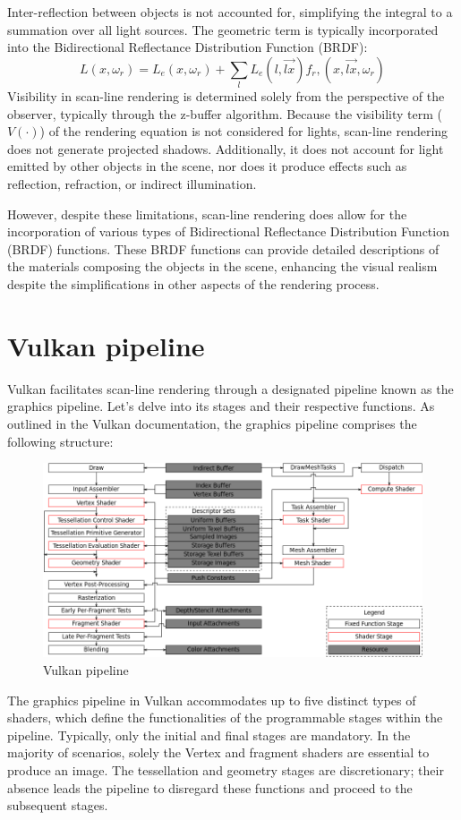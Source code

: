 Inter-reflection between objects is not accounted for, simplifying the integral to a summation over all light sources. 
The geometric term is typically incorporated into the Bidirectional Reflectance Distribution Function (BRDF): 
\[L(x,\omega_r)=L_e(x,\omega_r)+\sum_l L_e(l,\overrightarrow{lx})f_r,(x,\overrightarrow{lx},\omega_r)\]
Visibility in scan-line rendering is determined solely from the perspective of the observer, typically through the z-buffer algorithm. 
Because the visibility term ($V(\cdot)$) of the rendering equation is not considered for lights, scan-line rendering does not generate projected shadows. 
Additionally, it does not account for light emitted by other objects in the scene, nor does it produce effects such as reflection, refraction, or indirect illumination.

However, despite these limitations, scan-line rendering does allow for the incorporation of various types of Bidirectional Reflectance Distribution Function (BRDF) functions.
These BRDF functions can provide detailed descriptions of the materials composing the objects in the scene, enhancing the visual realism despite the simplifications in other aspects of the rendering process.

\section{Vulkan pipeline}
Vulkan facilitates scan-line rendering through a designated pipeline known as the graphics pipeline.
Let's delve into its stages and their respective functions. As outlined in the Vulkan documentation, the graphics pipeline comprises the following structure:
\begin{figure}[H]
    \centering
    \includegraphics[width=0.75\linewidth]{images/pipelinemesh.png}
    \caption{Vulkan pipeline}
\end{figure}
The graphics pipeline in Vulkan accommodates up to five distinct types of shaders, which define the functionalities of the programmable stages within the pipeline. 
Typically, only the initial and final stages are mandatory. 
In the majority of scenarios, solely the Vertex and fragment shaders are essential to produce an image. 
The tessellation and geometry stages are discretionary; their absence leads the pipeline to disregard these functions and proceed to the subsequent stages.

